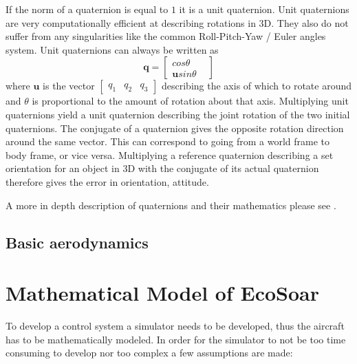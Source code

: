 \documentclass{article}
\begin{document}
If the norm of a quaternion is equal to $1$ it is a unit quaternion.
Unit quaternions are very computationally efficient at describing rotations in 3D.
They also do not suffer from any singularities like the common Roll-Pitch-Yaw / Euler angles system.
Unit quaternions can always be written as
\begin{equation}
    \mathbf{q} = \left[\begin{matrix} cos \theta &\\ \mathbf{u} sin \theta\end{matrix}\right]
\end{equation}
where $\mathbf{u}$ is the vector $\left[\begin{matrix} q_1 & q_2 & q_3 \end{matrix}\right]$
describing the axis of which to rotate around and $\theta$ is proportional to the amount of rotation about that axis.
Multiplying unit quaternions yield a unit quaternion describing the joint rotation of the two initial quaternions.
The conjugate of a quaternion gives the opposite rotation direction around the same vector.
This can correspond to going from a world frame to body frame, or vice versa.
Multiplying a reference quaternion describing a set orientation for an object in 3D with the conjugate of its actual quaternion therefore gives the error in orientation, attitude.

A more in depth description of quaternions and their mathematics please see \cite{Sola2016}.



\subsection {Basic aerodynamics}


\section{Mathematical Model of EcoSoar}
To develop a control system a simulator needs to be developed, thus the aircraft has to be mathematically modeled.
In order for the simulator to not be too time consuming to develop nor too complex a few assumptions are made:


%
\end{document}
